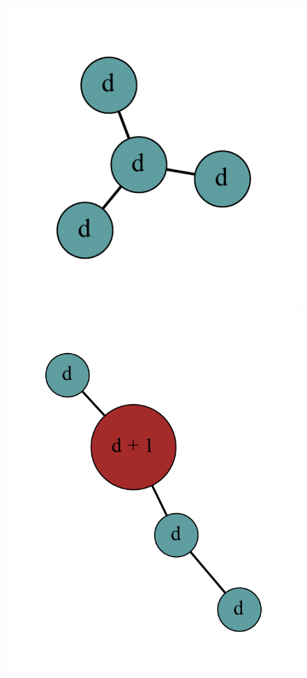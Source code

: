 \documentclass[12pt]{article}
\theoremstyle{plain}
\theoremstyle{definition}
\theoremstyle{remark}
\begin{document}
		\begin{figure}[htb]
					\centering
			\includegraphics[scale=0.5]{Superabundance/all/001011[1,1,1,3].pdf}
			\includegraphics[scale=0.5]{Superabundance/all/011010[2,1,1,3].pdf}

\end{figure}
\end{document}
